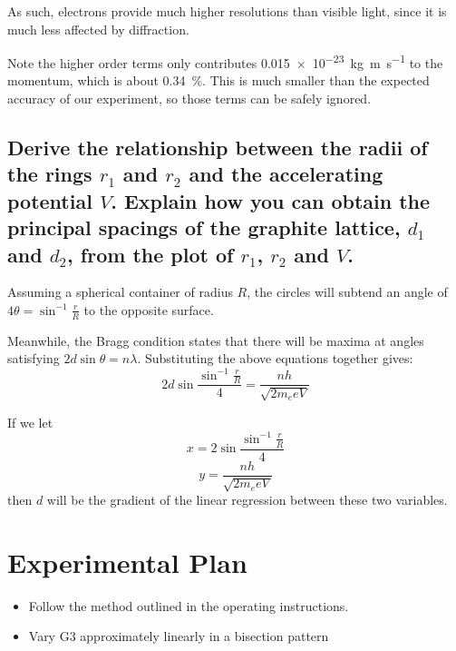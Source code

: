 \documentclass[a4paper]{scrartcl}
\begin{document}
As such, electrons provide much higher resolutions than visible light, since it is much less affected by diffraction.

Note the higher order terms only contributes \SI{0.015e-23}{\kilo\gram\metre\per\second} to the momentum, which is about \SI{0.34}{\percent}. This is much smaller than the expected accuracy of our experiment, so those terms can be safely ignored.

\subsection{Derive the relationship between the radii of the rings \(r_1\) and \(r_2\) and the accelerating potential \(V\). Explain how you can obtain the principal spacings of the graphite lattice, \(d_1\) and \(d_2\), from the plot of \(r_1\), \(r_2\) and \(V\).}
Assuming a spherical container of radius \(R\), the circles will subtend an angle of \(4 \theta = \sin^{-1} \frac{r}{R}\) to the opposite surface.

Meanwhile, the Bragg condition states that there will be maxima at angles satisfying \(2 d \sin \theta = n \lambda\). Substituting the above equations together gives:
\[2 d \sin \frac{\sin^{-1} \frac{r}{R}}{4} = \frac{n h}{\sqrt{2 m_e e V}}\]

If we let
\[x = 2 \sin \frac{\sin^{-1} \frac{r}{R}}{4}\]
\[y = \frac{n h}{\sqrt{2 m_e e V}}\]
then \(d\) will be the gradient of the linear regression between these two variables.

\section{Experimental Plan}
\begin{itemize}
    \item Follow the method outlined in the operating instructions.
    \item Vary G3 approximately linearly in a bisection pattern
\end{itemize}
\end{document}
